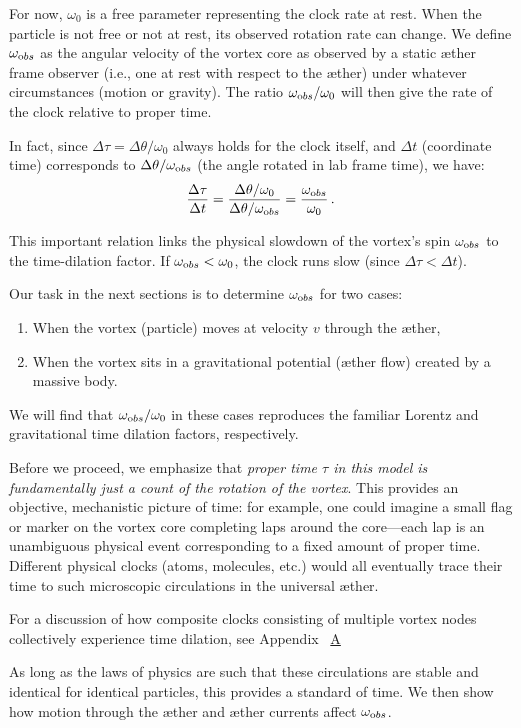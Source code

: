 For now, $\omega_0$ is a free parameter representing the clock rate at rest. When the particle is not free or not at rest, its observed rotation rate can change. We define $\omega_{\textrm obs}$ as the angular velocity of the vortex core as observed by a static æther frame observer (i.e., one at rest with respect to the æther) under whatever circumstances (motion or gravity). The ratio $\omega_{\textrm obs}/\omega_0$ will then give the rate of the clock relative to proper time.

In fact, since $\Delta \tau = \Delta \theta / \omega_0$ always holds for the clock itself, and $\Delta t$ (coordinate time) corresponds to $\Delta \theta / \omega_{\textrm obs}$ (the angle rotated in lab frame time), we have:
\begin{equation}
\frac{\Delta \tau}{\Delta t} = \frac{\Delta \theta / \omega_0}{\Delta \theta / \omega_{\textrm obs}} = \frac{\omega_{\textrm obs}}{\omega_0} \,.
\end{equation}

This important relation links the physical slowdown of the vortex's spin $\omega_{\textrm obs}$ to the time-dilation factor. If $\omega_{\textrm obs} < \omega_0$, the clock runs slow (since $\Delta \tau < \Delta t$).

Our task in the next sections is to determine $\omega_{\textrm obs}$ for two cases:
\begin{enumerate}
    \item When the vortex (particle) moves at velocity $v$ through the æther,
    \item When the vortex sits in a gravitational potential (æther flow) created by a massive body.
\end{enumerate}
We will find that $\omega_{\textrm obs}/\omega_0$ in these cases reproduces the familiar Lorentz and gravitational time dilation factors, respectively.

Before we proceed, we emphasize that \emph{proper time $\tau$ in this model is fundamentally just a count of the rotation of the vortex}. This provides an objective, mechanistic picture of time: for example, one could imagine a small flag or marker on the vortex core completing laps around the core—each lap is an unambiguous physical event corresponding to a fixed amount of proper time. Different physical clocks (atoms, molecules, etc.) would all eventually trace their time to such microscopic circulations in the universal æther.

For a discussion of how composite clocks consisting of multiple vortex nodes collectively experience time dilation, see Appendix~ \hyperref[appendix:ClocksInVortexStructures]{A}

As long as the laws of physics are such that these circulations are stable and identical for identical particles, this provides a standard of time. We then show how motion through the æther and æther currents affect $\omega_{\textrm obs}$.